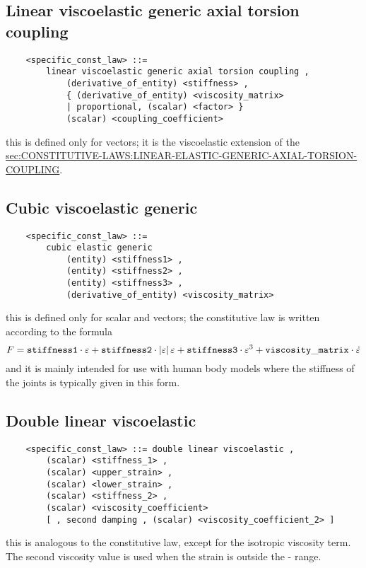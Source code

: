 \subsection{Linear viscoelastic generic axial torsion coupling}
\begin{verbatim}
    <specific_const_law> ::= 
        linear viscoelastic generic axial torsion coupling ,  
            (derivative_of_entity) <stiffness> ,
            { (derivative_of_entity) <viscosity_matrix> 
            | proportional, (scalar) <factor> }
            (scalar) <coupling_coefficient>
\end{verbatim}
this is defined only for  vectors; it is the viscoelastic 
extension of the 
\hyperref{\kw{linear elastic generic axial torsion coupling} constitutive law}{\kw{linear elastic generic axial torsion coupling} constitutive law (see Section~}{)}{sec:CONSTITUTIVE-LAWS:LINEAR-ELASTIC-GENERIC-AXIAL-TORSION-COUPLING}.


\subsection{Cubic viscoelastic generic}
\begin{verbatim}
    <specific_const_law> ::= 
        cubic elastic generic
            (entity) <stiffness1> ,
            (entity) <stiffness2> ,
            (entity) <stiffness3> ,
            (derivative_of_entity) <viscosity_matrix> 
\end{verbatim}
this is defined only for scalar and  vectors; the constitutive
law is written according to the formula
\begin{displaymath}
	F = \mathtt{stiffness1} \cdot \varepsilon
	+ \mathtt{stiffness2} \cdot \left| \varepsilon \right|\varepsilon
	+ \mathtt{stiffness3} \cdot \varepsilon^3
	+ \mathtt{viscosity\_matrix} \cdot \dot{\varepsilon}
\end{displaymath}
and it is mainly intended for use with human body models 
where the stiffness of the joints is typically given in this form.

\subsection{Double linear viscoelastic}
\begin{verbatim}
    <specific_const_law> ::= double linear viscoelastic ,
        (scalar) <stiffness_1> ,
        (scalar) <upper_strain> ,
        (scalar) <lower_strain> ,
        (scalar) <stiffness_2> ,
        (scalar) <viscosity_coefficient>
        [ , second damping , (scalar) <viscosity_coefficient_2> ]
\end{verbatim}
this is analogous to the  constitutive law,
except for the isotropic viscosity term.
The second viscosity value is used when the strain is outside the
- range.


